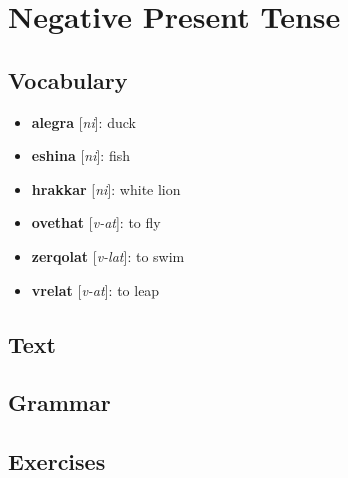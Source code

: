 \chapter{Negative Present Tense}
\section*{Vocabulary}
\begin{itemize}
	\item \textbf{alegra} [\textit{ni}]: duck
	\item \textbf{eshina} [\textit{ni}]: fish
	\item \textbf{hrakkar} [\textit{ni}]: white lion
	\item \textbf{ovethat} [\textit{v-at}]: to fly
	\item \textbf{zerqolat} [\textit{v-lat}]: to swim
	\item \textbf{vrelat} [\textit{v-at}]: to leap
\end{itemize}
\section*{Text}
\section*{Grammar}
\section*{Exercises}
